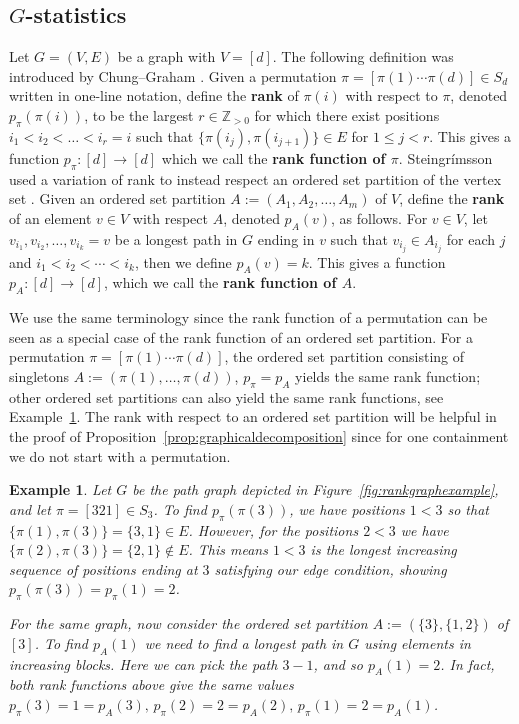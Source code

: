 \documentclass[11pt]{amsart}
\newtheorem{exam}{Example}
\newenvironment{example}{\begin{exam}\sf}{\end{exam}}
\newcommand\Def[1]{{\bf #1}}
\newcommand{\rk}[1][\pi]{p_{#1}}
\begin{document}

\subsection{$G$-statistics}
Let $G = (V, E)$ be a graph with $V = [d]$. 
The following definition was introduced by Chung--Graham \cite{chunggrahamcoverpol}.
Given a permutation $\pi = [\pi(1) \cdots \pi(d)] \in S_d$ written in one-line notation, define the \Def{rank} of $\pi(i)$ with respect to $\pi$, denoted $\rk(\pi(i))$, to be the largest $r \in \mathbb{Z}_{>0}$ for which there
exist positions $i_1 < i_2 < \dots < i_r = i$ such that $\{\pi(i_j), \pi(i_{j+1}) \} \in E$ for $1 \le j < r$. 
This gives a function $\rk:[d] \to [d]$ which we call the \Def{rank function of $\pi$}.
Steingrímsson used a variation of rank to instead respect an ordered set partition of the vertex set \cite{steingrimssoncoloring}. Given an ordered set partition $A := (A_1,
A_2, \ldots, A_m)$ of $V$, define the \Def{rank} of an element $v \in V$ with respect $A$, denoted $\rk[A](v)$, as follows. 
For $v \in V$, let $v_{i_1}, v_{i_2}, \ldots, v_{i_k} = v$ be a longest path in $G$ ending in $v$ such that $v_{i_j} \in A_{i_j}$ for each $j$ and $i_1 < i_2 < \cdots < i_k$, then we define $\rk[A](v) = k$. 
This gives a function $\rk[A]: [d] \to [d]$, which we call the \Def{rank function of $A$}.

We use the same terminology since the rank function of a permutation can be seen as a special case of the rank function of an ordered set partition. 
For a permutation $\pi = [\pi(1) \cdots \pi(d)]$, the ordered set partition consisting of singletons $A:=(\pi(1),\ldots,\pi(d))$, $\rk = \rk[A]$ yields the same rank function; other ordered set partitions can also yield the same rank functions, see Example~\ref{ex:rank}.
The rank with respect to an ordered set partition will be helpful in the proof of
Proposition~\ref{prop:graphicaldecomposition} since for one containment we do not start with a permutation. 

\begin{example}\label{ex:rank}
    Let $G$ be the path graph depicted in Figure~\ref{fig:rankgraphexample}, and let $\pi = [321] \in S_3$. To find $\rk(\pi(3))$, we have positions $1 <3$ so that $\{\pi(1),\pi(3) \} = \{3,1 \}\in E$. 
    However, for the positions $2<3$ we have $\{\pi(2),\pi(3)\} = \{2,1 \} \notin E$. 
    This means $1<3$ is the longest increasing sequence of positions ending at $3$ satisfying our edge condition, showing $\rk(\pi(3))=\rk(1)=2$.
    
    For the same graph, now consider the ordered set partition $A:=(\{3\},\{1,2\})$ of $[3]$. To find $\rk[A](1)$ we need to find a longest path in $G$ using elements in increasing blocks. 
    Here we can pick the path $3-1$, and so $\rk[A](1)=2$.
    In fact, both rank functions above give the same values $\rk(3)=1 =\rk[A](3), \, \rk(2)=2=\rk[A](2), \, \rk(1)=2 = \rk[A](1)$.
\end{example}
\end{document}

